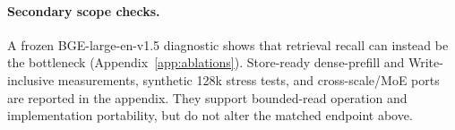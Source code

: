 \paragraph{Secondary scope checks.}
A frozen BGE-large-en-v1.5 diagnostic shows that retrieval recall can instead be
the bottleneck (Appendix~\ref{app:ablations}). Store-ready dense-prefill and
Write-inclusive measurements, synthetic 128k stress tests, and cross-scale/MoE
ports are reported in the appendix. They support bounded-read operation and
implementation portability, but do not alter the matched endpoint above.

